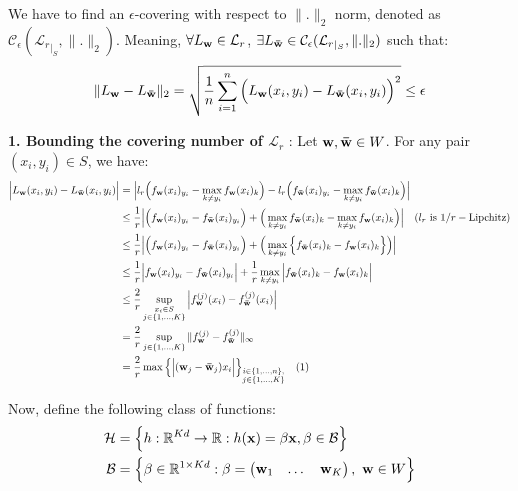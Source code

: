\noindent We have to find an $\epsilon$-covering with respect to $\|.\|_2$ norm, denoted as $\mathcal{C}_\epsilon({\mathcal{L}_r}_{|_S}, \|.\|_2)$. Meaning, $\forall L_{\bf w}\in\mathcal{L}_r$, $\exists L_{\bf \bar w} \in \mathcal{C}_\epsilon({\mathcal{L}_r}_{|_S}, \|.\|_2)$ such that:
\begin{align*}
    \|L_{\bf w} - L_{\bf \bar w}\|_2 = \sqrt{
        \frac{1}{n} \sum_{i=1}^n \Big( 
            L_{\bf w}(x_i, y_i) - L_{\bf \bar w}(x_i, y_i)
         \Big)^2
    } \le \epsilon
\end{align*}

\noindent\textbf{1. Bounding the covering number of $\mathcal{L}_r$} : Let ${\bf w}, {\bf \bar w}\in W$. For any pair $(x_i, y_i) \in S$, we have:
\begin{align*}
    \Big| L_{\bf w}(x_i, y_i) - L_{\bf \bar w}(x_i, y_i) \Big|
        &= \Big| 
            l_r\Big(  f_{\bf w}(x_i)_{y_i} - \max_{k\ne y_i} f_{\bf w}(x_i)_k  \Big) - l_r\Big(  f_{\bf \bar w}(x_i)_{y_i} - \max_{k\ne y_i} f_{\bf \bar w}(x_i)_k  \Big)
         \Big| \\
        &\le \frac{1}{r}\Big| 
            \Big( f_{\bf w}(x_i)_{y_i} - f_{\bf \bar w}(x_i)_{y_i} \Big) + \Big( \max_{k\ne y_i} f_{\bf \bar w}(x_i)_k - \max_{k\ne y_i} f_{\bf w}(x_i)_k \Big)
         \Big|\ \ \ (l_r \text{ is } 1/r-\text{Lipchitz}) \\
        &\le \frac{1}{r}\Big| 
            \Big( f_{\bf w}(x_i)_{y_i} - f_{\bf \bar w}(x_i)_{y_i} \Big) + \Big( \max_{k\ne y_i} \Big\{ f_{\bf \bar w}(x_i)_k - f_{\bf w}(x_i)_k \Big\} \Big)
         \Big| \\
        &\le \frac{1}{r}\Big| f_{\bf w}(x_i)_{y_i} - f_{\bf \bar w}(x_i)_{y_i} \Big| + \frac{1}{r}\max_{k\ne y_i}\Big| f_{{\bf \bar w}}(x_i)_k - f_{\bf w}(x_i)_k \Big| \\
        &\le \frac{2}{r}\sup_{\substack{x_i \in S \\ j \in \{1, \dots, K\}}}\Big| 
            f_{\bf w}^{(j)}(x_i) - f^{(j)}_{\bf \bar w}(x_i)
         \Big| \\
        &= \frac{2}{r}\sup_{j\in\{1, \dots, K\}} \|f^{(j)}_{\bf w} - f^{(j)}_{\bf \bar w}\|_\infty \\
        &= \frac{2}{r}\max\Big\{ \Big| ({\bf w}_j - {\bf \bar w}_j)x_i \Big| \Big\}_{\substack{i\in\{1, \dots, n\}, \\j\in\{1, \dots, K\}}} \ \ \ (1)
\end{align*}

\noindent Now, define the following class of functions:
\begin{align*}
    \mathcal{H} &= \Big\{ 
        h:\mathbb{R}^{Kd} \to \mathbb{R} : h({\bf x}) = \beta {\bf x}, \beta \in \mathcal{B}
     \Big\} \\
    \mathcal{B} &= \Big\{ 
        \beta \in \mathbb{R}^{1\times Kd} : \beta = \begin{pmatrix}
            {\bf w}_1 & \dots & {\bf w}_K
        \end{pmatrix}, \ {\bf w} \in W
     \Big\}
\end{align*}

